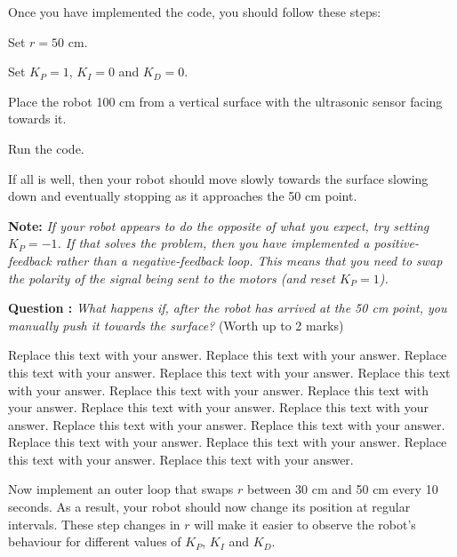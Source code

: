\documentclass[hidelinks,a4paper,11pt]{article}
\newcounter{question}
\newcommand\myq{\refstepcounter{question}\thequestion}
\begin{document}
Once you have implemented the code, you should follow these steps:
\begin{todolist}
	\item Set $r=50$ cm.
	\item Set $K_P=1$, $K_I=0$ and $K_D=0$.
	\item Place the robot 100 cm from a vertical surface with the ultrasonic sensor facing towards it.
	\item Run the code.
\end{todolist}

If all is well, then your robot should move slowly towards the surface slowing down and eventually stopping as it approaches the 50 cm point.

{\bfseries Note:}  \emph{If your robot appears to do the opposite of what you expect, try setting $K_P=-1$.  If that solves the problem, then you have implemented a positive-feedback rather than a negative-feedback loop.  This means that you need to swap the polarity of the signal being sent to the motors (and reset $K_P=1$).}

{\bfseries Question \myq:}  \emph{What happens if, after the robot has arrived at the 50 cm point, you manually push it towards the surface?} (Worth up to 2 marks)\\
\begin{mdframed}
Replace this text with your answer.  Replace this text with your answer.  Replace this text with your answer.  Replace this text with your answer.  Replace this text with your answer.  Replace this text with your answer.  Replace this text with your answer.  Replace this text with your answer.  Replace this text with your answer.  Replace this text with your answer.  Replace this text with your answer.  Replace this text with your answer.  Replace this text with your answer.  Replace this text with your answer.  Replace this text with your answer.
\end{mdframed}
\vspace*{\baselineskip}

Now implement an outer loop that swaps $r$ between 30 cm and 50 cm every 10 seconds.  As a result, your robot should now change its position at regular intervals.  These step changes in $r$ will make it easier to observe the robot's behaviour for different values of $K_P$, $K_I$ and $K_D$.
\end{document}
